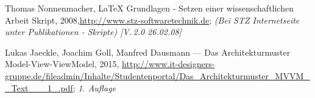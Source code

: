 \begin{thebibliography}{XXXX}
 Thomas Nonnenmacher, LaTeX Grundlagen - Setzen einer wissenschaftlichen Arbeit Skript, 2008,\url{http://www.stz-softwaretechnik.de}; \textit{(Bei STZ Internetseite unter Publikationen - Skripte) [V.\,2.0 26.02.08]}

 Lukas Jaeckle, Joachim Goll, Manfred Dausmann --- Das Architekturmuster Model-View-ViewModel, 2015, \url{http://www.it-designers-gruppe.de/fileadmin/Inhalte/Studentenportal/Das_Architekturmuster_MVVM__Text___1_.pdf}; \textit{1. Auflage}
\end{thebibliography}

